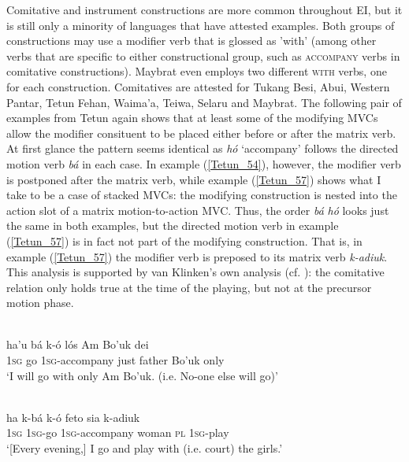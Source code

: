 Comitative and instrument constructions are more common throughout EI, but it is still only a minority of languages that have attested examples. Both groups of constructions may use a modifier verb that is glossed as 'with' (among other verbs that are specific to either constructional group, such as \textsc{accompany} verbs in comitative constructions). Maybrat even employs two different \textsc{with} verbs, one for each construction. Comitatives are attested for Tukang Besi, Abui, Western Pantar, Tetun Fehan, Waima'a, Teiwa, Selaru and Maybrat. The following pair of examples from Tetun again shows that at least some of the modifying MVCs allow the modifier consituent to be placed either before or after the matrix verb. At first glance the pattern seems identical as \textit{hó} `accompany' follows the directed motion verb \textit{bá} in each case. In example (\ref{Tetun_54}), however, the modifier verb is postponed after the matrix verb, while example (\ref{Tetun_57}) shows what I take to be a case of stacked MVCs: the modifying construction is nested into the action slot of a matrix motion-to-action MVC. Thus, the order \textit{bá} \textit{hó} looks just the same in both examples, but the directed motion verb in example (\ref{Tetun_57}) is in fact not part of the modifying construction. That is, in example (\ref{Tetun_57}) the modifier verb is preposed to its matrix verb \textit{k-adiuk}. This analysis is supported by van Klinken's own analysis (cf. \citealt[272]{vanklinken1999grammar}): the comitative relation only holds true at the time of the playing, but not at the precursor motion phase.

\ea \label{Tetun_54}
\\
\gll ha'u bá k-ó lós Am Bo'uk dei \\
1\textsc{sg} go 1\textsc{sg}-accompany just father Bo'uk only \\
\glft `I will go with only Am Bo'uk. (i.e. No-one else will go)'\\ 
\z

\ea \label{Tetun_57}
\\
\gll ha k-bá k-ó feto sia k-adiuk \\
1\textsc{sg} 1\textsc{sg}-go 1\textsc{sg}-accompany woman \textsc{pl} 1\textsc{sg}-play \\
\glft `[Every evening,] I go and play with (i.e. court) the girls.'\\ 
\z

